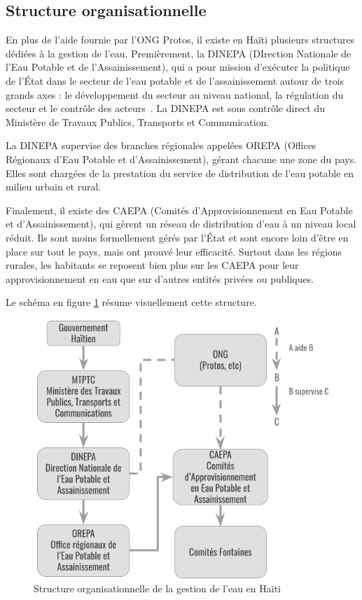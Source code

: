 \documentclass{EPL-master-thesis-covers-FR}
\begin{document}
			\subsection*{Structure organisationnelle}
				\label{sec:structure_haiti}

				En plus de l'aide fournie par l'ONG Protos, il existe en Haïti plusieurs structures dédiées à la gestion de l'eau. Premièrement, la DINEPA (DIrection Nationale de l'Eau Potable et de l'Assainissement), qui a pour mission d’exécuter la politique de l’\'Etat dans le secteur de l’eau potable et de l’assainissement autour de trois grands axes : le développement du secteur au niveau national, la régulation du secteur et le contrôle des acteurs~\cite{ref:dinepa}. La DINEPA est sous contrôle direct du Ministère de Travaux Publics, Transports et Communication.

				La DINEPA supervise des branches régionales appelées OREPA (Offices Régionaux d'Eau Potable et d'Assainissement), gérant chacune une zone du pays. Elles sont chargées de la prestation du service de distribution de l'eau potable en milieu urbain et rural.

				Finalement, il existe des CAEPA (Comités d’Approvisionnement en Eau Potable et d'Assainissement), qui gèrent un réseau de distribution d'eau à un niveau local réduit. Ils sont moins formellement gérés par l'\'Etat et sont encore loin d'être en place sur tout le pays, mais ont prouvé leur efficacité. Surtout dans les régions rurales, les habitants se reposent bien plus sur les CAEPA pour leur approvisionnement en eau que sur d'autres entités privées ou publiques.

				Le schéma en figure \ref{fig:organisation} résume visuellement cette structure.

				\begin{figure}
					\begin{center}
						\includegraphics[width=\textwidth/2]{images/organisation}
						\caption{Structure organisationnelle de la gestion de l'eau en Haïti}
						\label{fig:organisation}
					\end{center}
				\end{figure}
\end{document}
